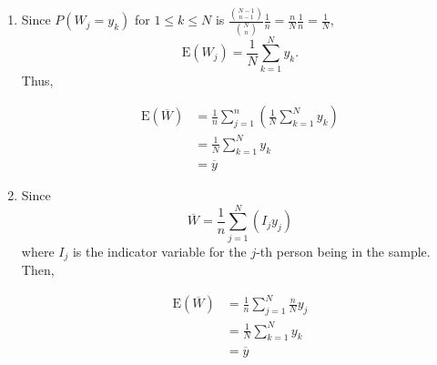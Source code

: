 \begin{enumerate}[label=(\alph*)]
\item Since $P(W_{j} = y_{k})$
for $1 \leq k \leq N$ is $\frac{\binom{N-1}{n-1}}{\binom{N}{n}}\frac{1}{n} =
\frac{n}{N}\frac{1}{n} = \frac{1}{N}$,
$$\text{E}(W_{j}) = \frac{1}{N}\sum_{k=1}^{N}y_{k}.$$
Thus,

\begin{align*}
\text{E}(\overline{W}) &= \frac{1}{n}\sum_{j=1}^{n}(\frac{1}{N}\sum_{k=1}^{N}y_{k}) \\
&= \frac{1}{N}\sum_{k=1}^{N}y_{k} \\
&= \overline{y}
\end{align*}

\item Since $$\overline{W} = \frac{1}{n}\sum_{j=1}^{N}(I_{j}y_{j})$$ where $I_{j}$
is the
indicator variable for the $j$-th person being in the sample. Then, 

\begin{align*}
\text{E}(\overline{W}) &= \frac{1}{n}\sum_{j=1}^{N}\frac{n}{N}y_{j}\\
&= \frac{1}{N}\sum_{k=1}^{N}y_{k} \\
&= \overline{y}
\end{align*}
\end{enumerate}